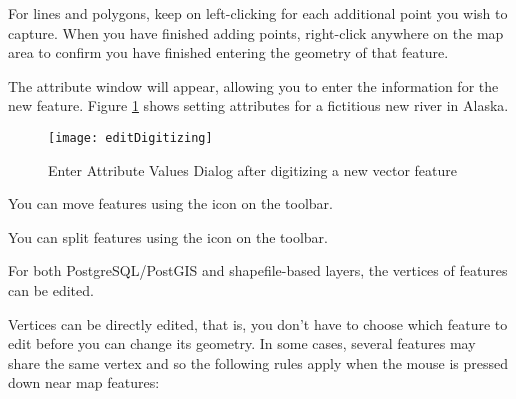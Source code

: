 For lines and polygons, keep on left-clicking for each additional
point you wish to capture.  When you have finished adding points,
right-click anywhere on the map area to confirm you have finished entering
the geometry of that feature.

The attribute window will appear, allowing you to enter the information for the new feature.
Figure \ref{fig:vector_digitising} shows setting attributes for a fictitious
new river in Alaska.

\begin{figure}[ht]
   \begin{center}
   \caption{Enter Attribute Values Dialog after digitizing a new vector
   feature \nixcaption}\label{fig:vector_digitising}\smallskip
   \texttt{[image: editDigitizing]}
\end{center}  
\end{figure}

\begin{Tip}[ht]\caption{\textsc{Attribute Value Types}}
\end{Tip}


You can move features using the  icon
on the toolbar.


You can split features using the  icon
on the toolbar.


For both PostgreSQL/PostGIS and shapefile-based layers, the vertices of features can be edited. 

Vertices can be directly edited, that is, you don't
have to choose which feature to edit before you can change
its geometry.
In some cases, several features may share the same vertex
and so the following rules apply when the mouse is pressed
down near map features:

